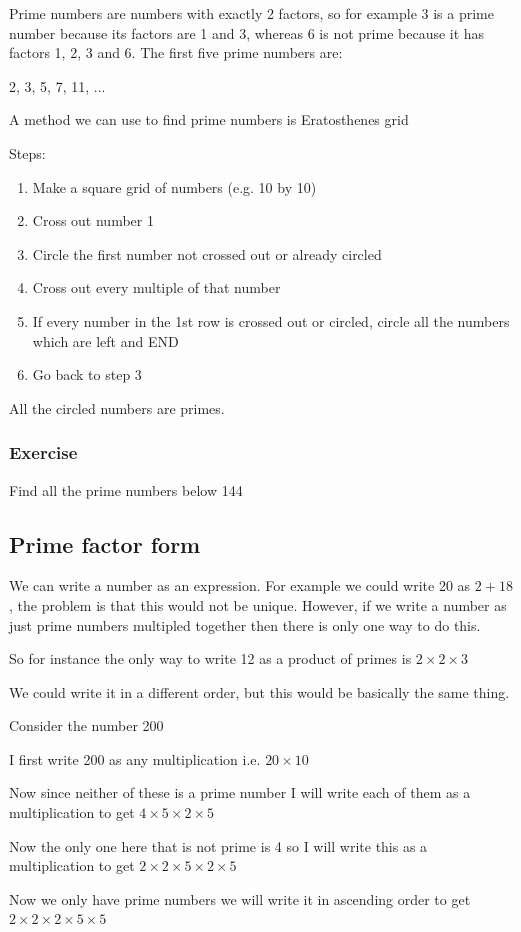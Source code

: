 Prime numbers are numbers with exactly 2 factors, so for example 3 is a prime number because its factors are 1 and 3, whereas 6 is not prime because it has factors 1, 2, 3 and 6.
The first five prime numbers are:

\bigskip

2, 3, 5, 7, 11, ...

\bigskip

A method we can use to find prime numbers is Eratosthenes grid

Steps:
\begin{enumerate}
  \item Make a square grid of numbers (e.g. 10 by 10)
  \item Cross out number 1
  \item Circle the first number not crossed out or already circled
  \item Cross out every multiple of that number
  \item If every number in the 1st row is crossed out or circled, circle all the numbers which are left and END
  \item Go back to step 3
\end{enumerate}

All the circled numbers are primes.

\subsubsection{Exercise}
Find all the prime numbers below 144

\subsection{Prime factor form}
We can write a number as an expression.  For example we could write 20 as $2 + 18$,  the problem is that this would not be unique.  However, if we write a number as just prime numbers multipled together then there is only one way to do this.

\bigskip

So for instance the only way to write 12 as a product of primes is $2 \times 2 \times 3$

We could write it in a different order, but this would be basically the same thing.

\begin{exmp}
Consider the number 200

I first write 200 as any multiplication  i.e. $20 \times 10$

Now since neither of these is a prime number I will write each of them as a multiplication to get $4 \times 5\times 2 \times 5$

Now the only one here that is not prime is 4 so I will write this as a multiplication to get $2 \times 2 \times 5\times 2 \times 5$

Now we only have prime numbers we will write it in ascending order to get $2 \times 2 \times 2 \times 5 \times 5$
\end{exmp}

